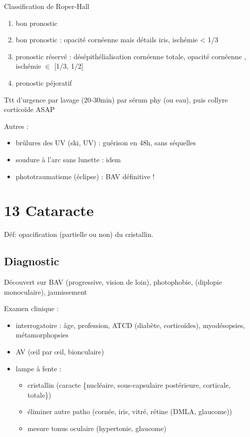 \documentclass[11pt]{article}
\begin{document}
Classification de Roper-Hall
\begin{enumerate}
\item bon pronostic
\item bon pronostic : opacité cornéenne mais détails iris, ischémie < 1/3 \diameter
\item pronostic réservé : désépithélialisation cornéenne totale, opacité cornéenne
, ischémie \(\in\) [1/3, 1/2] \diameter
\item pronostic péjoratif
\end{enumerate}

Ttt d'urgence par lavage (20-30min) par sérum phy (ou eau), puis collyre
corticoïde ASAP

Autres :
\begin{itemize}
\item brûlures des UV (ski, UV) : guérison en 48h, sans séquelles
\item soudure à l'arc sans lunette : idem
\item phototraumatisme (éclipse) : BAV définitive !
\end{itemize}

\section{13 Cataracte}
\label{sec:orga20513d}
Déf: opacification (partielle ou non) du cristallin. 

\subsection{Diagnostic}
\label{sec:orge896af5}
Découvert sur BAV (progressive, vision de loin), photophobie, (diplopie
monoculaire), jaunissement

Examen clinique :
\begin{itemize}
\item interrogatoire : âge, profession, ATCD (diabète, corticoïdes), myodésopsies,
métamorphopsies
\item AV (\oe{}il par \oe{}il, bionculaire)
\item lampe à fente : 
\begin{itemize}
\item cristallin (caracte \{nucléaire, sous-capsulaire postérieure, corticale, totale\})
\item éliminer autre patho (cornée, iris, vitré, rétine (DMLA, glaucome))
\item mesure tonus oculaire (hypertonie, glaucome)
\end{itemize}
\end{itemize}
\end{document}
